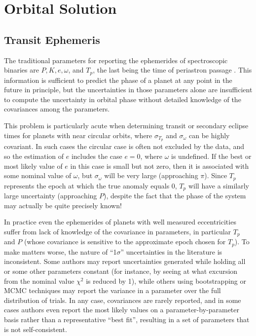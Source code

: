 \section{Orbital Solution}\label{sec:orbit}


\subsection{Transit Ephemeris}\label{sec:emph}

The traditional parameters for reporting the ephemerides of
spectroscopic binaries are $P, K, e, \omega$, and $T_p$, the last
being the time of periastron passage \citep{2009ApJS..182..205W}.
This information is sufficient to predict the phase of a planet at any
point in the future in principle, but the uncertainties in those
parameters alone are insufficient to compute the uncertainty in
orbital phase without detailed knowledge of the covariances among the
parameters.

This problem is particularly acute when determining transit or
secondary eclipse times for planets with near circular orbits, where
$\sigma_{T_p}$ and $\sigma_\omega$ can be highly covariant.  In such
cases the circular case is often not excluded by the data, and so the
estimation of $e$ includes the case $e=0$, where $\omega$ is
undefined.  If the best or most likely value of $e$ in this case is
small but not zero, then it is associated with some nominal value of
$\omega$, but $\sigma_\omega$ will be very large (approaching $\pi$).
Since $T_p$ represents the epoch at which the true anomaly equals
$0$, $T_p$ will have a similarly large uncertainty (approaching
$P$), despite the fact that the phase of the system may actually be
quite precisely known!

In practice even the ephemerides of planets with well measured
eccentricities suffer from lack of knowledge of the covariance in
parameters, in particular $T_p$ and $P$ (whose covariance is sensitive
to the approximate epoch chosen for $T_p$).  To make matters worse,
the nature of ``1$\sigma$'' uncertainties in the literature is
inconsistent.  Some authors may report uncertainties generated while
holding all or some other parameters constant (for instance, by seeing
at what excursion from the nominal value $\chi^2$ is reduced by 1),
while others using bootstrapping or MCMC techniques may report the
variance in a parameter over the full distribution of trials.  In any
case, covariances are rarely reported, and in some cases authors even
report the most likely values on a parameter-by-parameter basis rather
than a representative ``best fit'', resulting in a set of parameters
that is not self-consistent.

